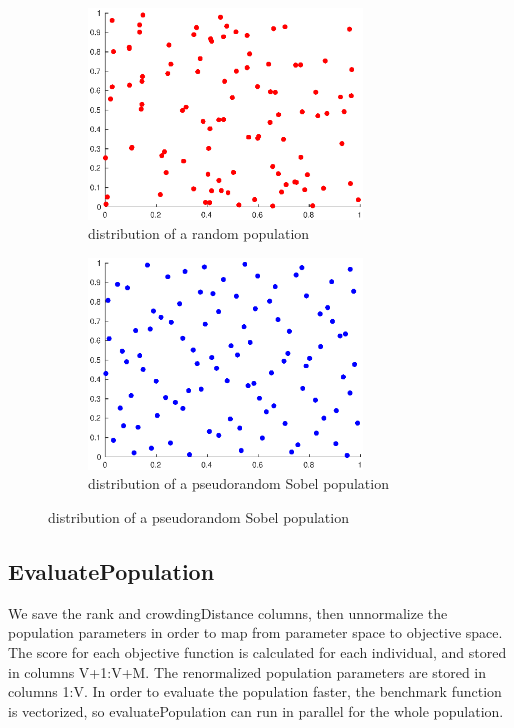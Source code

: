\begin{figure}[h!]
	\centering
	\begin{subfigure}{.5\textwidth}
		\centering
		\includegraphics[width=0.8\textwidth]{images/randInit}
		\caption{distribution of a random population}
	\end{subfigure}%
	\begin{subfigure}{.5\textwidth}
		\centering
		\includegraphics[width=0.8\textwidth]{images/sobolInit}
		\caption{distribution of a pseudorandom Sobel population}
	\end{subfigure}
\end{figure}

\subsection{EvaluatePopulation} \label{evaluatePopulation}
We save the rank and crowdingDistance columns, then unnormalize the population parameters in order to map from parameter space to objective space. The score for each objective function is calculated for each individual, and stored in columns V+1:V+M. The renormalized population parameters are stored in columns 1:V. 
In order to evaluate the population faster, the benchmark function is vectorized, so evaluatePopulation can run in parallel for the whole population.

